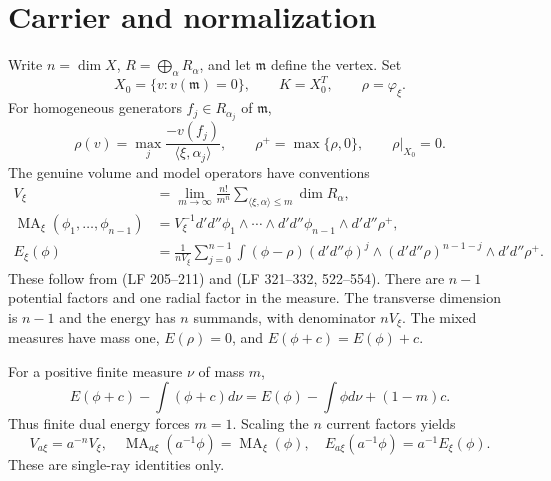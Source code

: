 \documentclass[11pt]{article}
\newcommand{\MA}{\operatorname{MA}}
\newcommand{\dd}{d'd''}
\theoremstyle{remark}
\begin{document}
\section{Carrier and normalization}
Write $n=\dim X$, $R=\bigoplus_\alpha R_\alpha$, and let $\mathfrak m$ define the vertex. Set
\[
 X_0=\{v:v(\mathfrak m)=0\},\qquad K=X_0^T,\qquad \rho=\varphi_\xi.
\]
For homogeneous generators $f_j\in R_{\alpha_j}$ of $\mathfrak m$,
\[
 \rho(v)=\max_j\frac{-v(f_j)}{\langle\xi,\alpha_j\rangle},\qquad
 \rho^+=\max\{\rho,0\},\qquad \rho|_{X_0}=0.
\]
The genuine volume and model operators have conventions
\begin{align}
 V_\xi&=\lim_{m\to\infty}\frac{n!}{m^n}
       \sum_{\langle\xi,\alpha\rangle\le m}\dim R_\alpha,\label{eq:vol}\\
 \MA_\xi(\phi_1,\ldots,\phi_{n-1})
   &=V_\xi^{-1}\dd\phi_1\wedge\cdots\wedge\dd\phi_{n-1}\wedge\dd\rho^+,\label{eq:ma}\\
 E_\xi(\phi)&=\frac1{nV_\xi}\sum_{j=0}^{n-1}
 \int(\phi-\rho)(\dd\phi)^j\wedge(\dd\rho)^{n-1-j}\wedge\dd\rho^+.
 \label{eq:energy}
\end{align}
These follow from \cite[Definition 2.4]{Wu21} (LF 205--211) and \cite[Theorem 2.12, Definition 4.1]{Wu24} (LF 321--332, 522--554). There are $n-1$ potential factors and one radial factor in the measure. The transverse dimension is $n-1$ and the energy has $n$ summands, with denominator $nV_\xi$. The mixed measures have mass one, $E(\rho)=0$, and $E(\phi+c)=E(\phi)+c$.

For a positive finite measure $\nu$ of mass $m$,
\[
 E(\phi+c)-\int(\phi+c)d\nu=E(\phi)-\int\phi d\nu+(1-m)c.
\]
Thus finite dual energy forces $m=1$. Scaling the $n$ current factors yields
\[
 V_{a\xi}=a^{-n}V_\xi,\quad
 \MA_{a\xi}(a^{-1}\phi)=\MA_\xi(\phi),\quad
 E_{a\xi}(a^{-1}\phi)=a^{-1}E_\xi(\phi).
\]
These are single-ray identities only.
\end{document}
